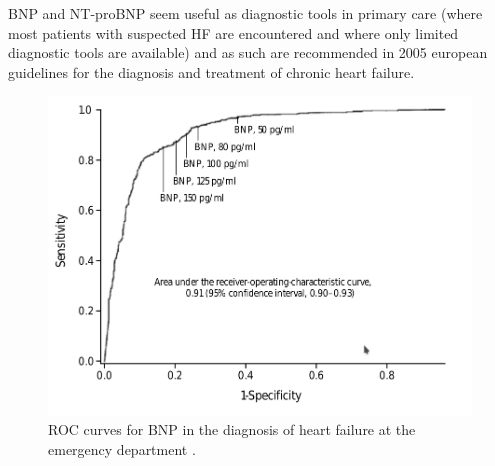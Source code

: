 \documentclass[14pt,a4paper,onecolumn]{extarticle}
\begin{document}
 BNP and NT-proBNP seem useful as diagnostic tools in primary care (where most patients with suspected HF are encountered and where only limited diagnostic tools are available) and as such are recommended in 2005 european guidelines for the diagnosis and treatment of chronic heart failure. \citep{Swedberg2005}





\begin{figure}

    \centering

    \includegraphics[scale=0.4]{../../images/BNP_ER.png}

    \small\caption{ROC curves for BNP in the diagnosis of heart failure at the emergency department \citep{Januzzi2005}.}

    \label{BNP_ER}

\end{figure}
\end{document}
